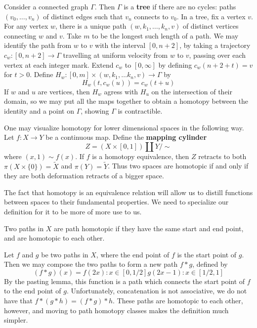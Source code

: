 \begin{example}
    Consider a connected graph $\Gamma$. Then $\Gamma$ is a {\bf tree} if there are no cycles: paths $(v_0, \dots, v_n)$ of distinct edges such that $v_n$ connects to $v_0$. In a tree, fix a vertex $v$. For any vertex $w$, there is a unique path $(w, k_1, \dots, k_n, v)$ of distinct vertices connecting $w$ and $v$. Take $m$ to be the longest such length of a path. We may identify the path from $w$ to $v$ with the interval $[0,n+2]$, by taking a trajectory $c_w:[0,n+2] \to \Gamma$ travelling at uniform velocity from $w$ to $v$, passing over each vertex at each integer mark. Extend $c_w$ to $[0,\infty]$ by defining $c_w(n+2+t) = v$ for $t > 0$. Define $H_w: [0,m] \times (w, k_1, \dots k_n, v) \to \Gamma$ by
    \[ H_w(t, c_w(u)) = c_w(t + u) \]
    If $w$ and $u$ are vertices, then $H_w$ agress with $H_u$ on the intersection of their domain, so we may put all the maps together to obtain a homotopy between the identity and a point on $\Gamma$, showing $\Gamma$ is contractible.
\end{example}

One may visualize homotopy for lower dimensional spaces in the following way. Let $f:X \to Y$ be a continuous map. Define the {\bf mapping cylinder}
%
\[ Z = (X \times [0,1]) \coprod Y / {\sim} \]
%
where $(x,1) \sim f(x)$. If $f$ is a homotopy equivalence, then $Z$ retracts to both $\pi(X \times \{0\}) = \tilde{X}$ and $\pi(Y) = \tilde{Y}$. Thus two spaces are homotopic if and only if they are both deformation retracts of a bigger space.

The fact that homotopy is an equivalence relation will allow us to distill functions between spaces to their fundamental properties. We need to specialize our definition for it to be more of more use to us.

\begin{definition}
    Two paths in $X$ are path homotopic if they have the same start and end point, and are homotopic to each other.
\end{definition}

Let $f$ and $g$ be two paths in $X$, where the end point of $f$ is the start point of $g$. Then we may compose the two paths to form a new path $f * g$, defined by
%
\[ (f * g)(x) = f(2x): x \in [0,1/2]
                g(2x - 1): x \in [1/2,1] \]
%
By the pasting lemma, this function is a path which connects the start point of $f$ to the end point of $g$. Unfortunately, concatenation is not associative, we do not have that $f * (g * h) = (f * g) * h$. These paths are homotopic to each other, however, and moving to path homotopy classes makes the definition much simpler.

